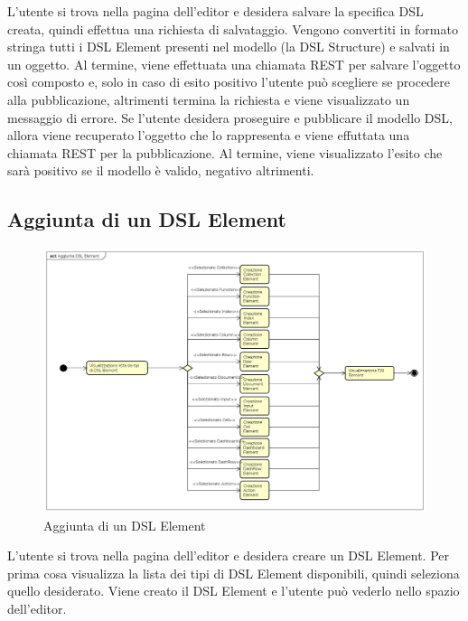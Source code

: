     L'utente si trova nella pagina dell'editor e desidera salvare la specifica DSL creata, quindi effettua una richiesta di salvataggio. Vengono convertiti in formato stringa tutti i DSL Element presenti nel modello (la DSL Structure) e salvati in un oggetto. Al termine, viene effettuata una chiamata REST per salvare l'oggetto così composto e, solo in caso di esito positivo l'utente può scegliere se procedere alla pubblicazione, altrimenti termina la richiesta e viene visualizzato un messaggio di errore.
    Se l'utente desidera proseguire e pubblicare il modello DSL, allora viene recuperato l'oggetto che lo rappresenta e viene effuttata una chiamata REST per la pubblicazione. Al termine, viene visualizzato l'esito che sarà positivo se il modello è valido, negativo altrimenti.
    \subsection{Aggiunta di un DSL Element}
    \begin{figure}[H]
      \centering
      \includegraphics[width=1.1\textwidth]{res/img/aggiuntaDSLElement.png}
      \caption{Aggiunta di un DSL Element}
      \label{fig:diagram_model}
    \end{figure}
    L'utente si trova nella pagina dell'editor e desidera creare un DSL Element. Per prima cosa visualizza la lista dei tipi di DSL Element disponibili, quindi seleziona quello desiderato. Viene creato il DSL Element e l'utente può vederlo nello spazio dell'editor.
